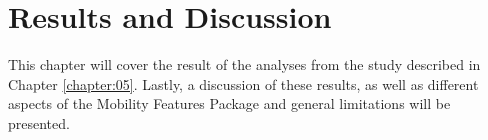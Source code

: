 \chapter{Results and Discussion}
\label{chapter:07}
This chapter will cover the result of the analyses from the study described in Chapter \ref{chapter:05}. Lastly, a discussion of these results, as well as different aspects of the Mobility Features Package and general limitations will be presented.





